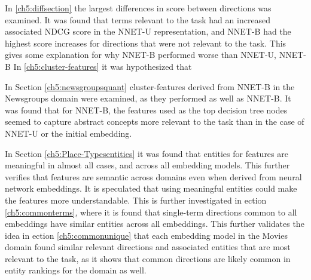 In  \ref{ch5:diffsection} the largest differences in score between directions was examined. It was found that terms relevant to the task had an increased associated NDCG score in the NNET-U representation, and NNET-B had the highest score increases for directions that were not relevant to the task. This gives some explanation for why NNET-B performed worse than NNET-U, NNET-B  In  \ref{ch5:cluster-features} it was hypothesized that   

In Section \ref{ch5:newsgroupsquant} cluster-features derived from NNET-B in the Newsgroups domain were examined, as they performed as well as NNET-B. It was found that for NNET-B, the features used as the top decision tree nodes seemed to capture abstract concepts more relevant to the task than in the case of NNET-U or the initial embedding. 

In Section \ref{ch5:Place-Typesentities} it was found that entities for features are meaningful in almost all cases, and across all embedding models. This further verifies that features are semantic across domains even when derived from neural network embeddings. It is speculated that using meaningful entities could make the features more understandable. This is further investigated in ection \ref{ch5:commonterms}, where it is found that single-term directions common to all embeddings have similar entities across all embeddings. This further validates the idea in ection \ref{ch5:commonunique} that each embedding model in the Movies domain found similar relevant directions and associated entities that are most relevant to the task, as it shows that common directions are likely common in entity rankings for the domain as well.









